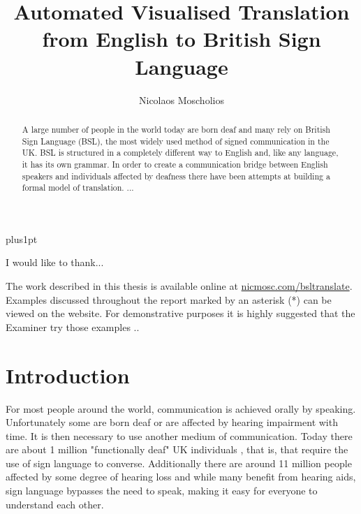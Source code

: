 \documentclass[12pt]{ociamthesis}  %
\title{Automated Visualised Translation from English to British Sign Language}
\author{Nicolaos Moscholios}             %
\begin{document}
\baselineskip=18pt plus1pt

\maketitle                  %

\begin{abstract}
A large number of people in the world today are born deaf and many rely on British Sign Language (BSL), the most widely used method of signed communication in the UK. BSL is structured in a completely different way to English and, like any language, it has its own grammar. In order to create a communication bridge between English speakers and individuals affected by deafness there have been attempts at building a formal model of translation. ...
\end{abstract}

\begin{acknowledgements}
I would like to thank...
\end{acknowledgements}

\begin{notes}
The work described in this thesis is available online at \url{nicmosc.com/bsltranslate}. Examples discussed throughout the report marked by an asterisk (*) can be viewed on the website. For demonstrative purposes it is highly suggested that the Examiner try those examples ..
\end{notes}

{\pagestyle{plain}
	\begin{romanpages}          %
	\setcounter{tocdepth}{5}
	\setcounter{secnumdepth}{5}
	\tableofcontents            %
	\listoffigures              %
	\end{romanpages}            %
\cleardoublepage}


\chapter{Introduction}
For most people around the world, communication is achieved orally by speaking. Unfortunately some are born deaf or are affected by hearing impairment with time. It is then necessary to use another medium of communication. Today there are about 1 million "functionally deaf" UK individuals , that is, that require the use of sign language to converse. Additionally there are around 11 million people affected by some degree of hearing loss and while many benefit from hearing aids, sign language bypasses the need to speak, making it easy for everyone to understand each other.  
\end{document}
